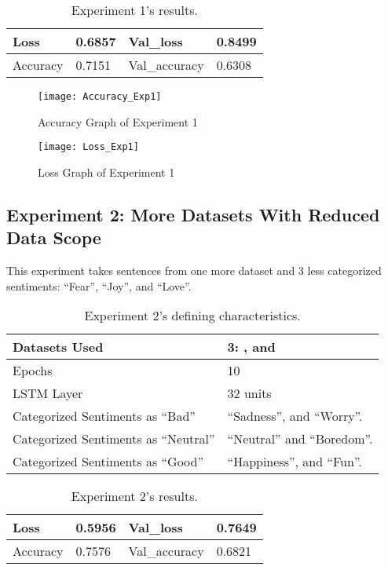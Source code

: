\begin{table}[!bh]
	\caption{Experiment 1's results.}
	\vspace{0.5cm}
	\centering
	\begin{tabular}[t]{|l|l|l|l|}
	\hline
		Loss & 0.6857 & Val\_loss & 0.8499
	\\ \hline
		Accuracy & 0.7151 & Val\_accuracy & 0.6308
	\\ \hline
	\end{tabular}
\end{table}


\begin{figure}[!h]
	\centering
	\texttt{[image: Accuracy\_Exp1]}
	\caption{Accuracy Graph of Experiment 1}
	\label{fig:accuracy_exp1}
	\texttt{[image: Loss\_Exp1]}
	\caption{Loss Graph of Experiment 1}
	\label{fig:loss_exp1}
\end{figure}
\pagebreak

\subsection{Experiment 2: More Datasets With Reduced Data Scope}
\label{exp2}
This experiment takes sentences from one more dataset and 3 less categorized sentiments: ``Fear'', ``Joy'', and ``Love''.
\begin{table}[!th]
	\caption{Experiment 2's defining characteristics.}
	\vspace{0.5cm}
	\centering
	\begin{tabular}[t]{|l|l|}
	\hline
		Datasets Used & \makecell{3: \citet{d1}, \citet{d2} and\\ \citet{d3}}
	\\ \hline
		Epochs & 10
	\\ \hline
		LSTM Layer & 32 units
	\\ \hline
		Categorized Sentiments as ``Bad'' & ``Sadness'', and ``Worry''.
	\\ \hline	
		 Categorized Sentiments as ``Neutral'' & ``Neutral'' and ``Boredom''.
	\\ \hline	
		Categorized Sentiments as ``Good'' & ``Happiness'', and ``Fun''.
	\\ \hline
	\end{tabular}
\end{table}

\begin{table}[!bh]
	\caption{Experiment 2's results.}
	\vspace{0.5cm}
	\centering
	\begin{tabular}[t]{|l|l|l|l|}
	\hline
		Loss & 0.5956 & Val\_loss & 0.7649
	\\ \hline
		Accuracy & 0.7576 & Val\_accuracy & 0.6821
	\\ \hline
	\end{tabular}
\end{table}


